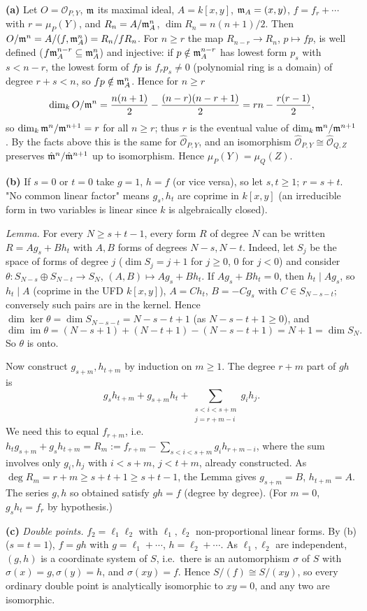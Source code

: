 \documentclass[11pt]{article}
\begin{document}
\textbf{(a)} Let $O=\mathcal O_{P,Y}$, $\mathfrak m$ its maximal ideal, $A=k[x,y]$, $\mathfrak m_A=(x,y)$, $f=f_r+\cdots$ with $r=\mu_P(Y)$, and $R_n=A/\mathfrak m_A^n$, $\dim R_n=n(n+1)/2$. Then $O/\mathfrak m^n=A/(f,\mathfrak m_A^n)=R_n/fR_n$. For $n\ge r$ the map $R_{n-r}\to R_n$, $p\mapsto fp$, is well defined ($f\mathfrak m_A^{n-r}\subseteq\mathfrak m_A^n$) and injective: if $p\notin\mathfrak m_A^{n-r}$ has lowest form $p_s$ with $s<n-r$, the lowest form of $fp$ is $f_rp_s\neq0$ (polynomial ring is a domain) of degree $r+s<n$, so $fp\notin\mathfrak m_A^n$. Hence for $n\ge r$
\[
\dim_kO/\mathfrak m^n=\frac{n(n+1)}2-\frac{(n-r)(n-r+1)}2=rn-\frac{r(r-1)}2,
\]
so $\dim_k\mathfrak m^n/\mathfrak m^{n+1}=r$ for all $n\ge r$; thus $r$ is the eventual value of $\dim_k\mathfrak m^n/\mathfrak m^{n+1}$. By the facts above this is the same for $\hat{\mathcal O}_{P,Y}$, and an isomorphism $\hat{\mathcal O}_{P,Y}\cong\hat{\mathcal O}_{Q,Z}$ preserves $\hat{\mathfrak m}^n/\hat{\mathfrak m}^{n+1}$ up to isomorphism. Hence $\mu_P(Y)=\mu_Q(Z)$.

\textbf{(b)} If $s=0$ or $t=0$ take $g=1$, $h=f$ (or vice versa), so let $s,t\ge1$; $r=s+t$. "No common linear factor" means $g_s,h_t$ are coprime in $k[x,y]$ (an irreducible form in two variables is linear since $k$ is algebraically closed).

\emph{Lemma.} For every $N\ge s+t-1$, every form $R$ of degree $N$ can be written $R=Ag_s+Bh_t$ with $A,B$ forms of degrees $N-s,N-t$. Indeed, let $S_j$ be the space of forms of degree $j$ ($\dim S_j=j+1$ for $j\ge0$, $0$ for $j<0$) and consider $\theta:S_{N-s}\oplus S_{N-t}\to S_N$, $(A,B)\mapsto Ag_s+Bh_t$. If $Ag_s+Bh_t=0$, then $h_t\mid Ag_s$, so $h_t\mid A$ (coprime in the UFD $k[x,y]$), $A=Ch_t$, $B=-Cg_s$ with $C\in S_{N-s-t}$; conversely such pairs are in the kernel. Hence $\dim\ker\theta=\dim S_{N-s-t}=N-s-t+1$ (as $N-s-t+1\ge0$), and
\[
\dim\operatorname{im}\theta=(N-s+1)+(N-t+1)-(N-s-t+1)=N+1=\dim S_N.
\]
So $\theta$ is onto.

Now construct $g_{s+m},h_{t+m}$ by induction on $m\ge1$. The degree $r+m$ part of $gh$ is
\[
g_sh_{t+m}+g_{s+m}h_t+\sum_{\substack{s<i<s+m\\ j=r+m-i}}g_ih_j .
\]
We need this to equal $f_{r+m}$, i.e.\ $h_tg_{s+m}+g_sh_{t+m}=R_m:=f_{r+m}-\sum_{s<i<s+m}g_ih_{r+m-i}$, where the sum involves only $g_i,h_j$ with $i<s+m$, $j<t+m$, already constructed. As $\deg R_m=r+m\ge s+t+1\ge s+t-1$, the Lemma gives $g_{s+m}=B$, $h_{t+m}=A$. The series $g,h$ so obtained satisfy $gh=f$ (degree by degree). (For $m=0$, $g_sh_t=f_r$ by hypothesis.)

\textbf{(c)} \emph{Double points.} $f_2=\ell_1\ell_2$ with $\ell_1,\ell_2$ non-proportional linear forms. By (b) ($s=t=1$), $f=gh$ with $g=\ell_1+\cdots$, $h=\ell_2+\cdots$. As $\ell_1,\ell_2$ are independent, $(g,h)$ is a coordinate system of $S$, i.e.\ there is an automorphism $\sigma$ of $S$ with $\sigma(x)=g,\sigma(y)=h$, and $\sigma(xy)=f$. Hence $S/(f)\cong S/(xy)$, so every ordinary double point is analytically isomorphic to $xy=0$, and any two are isomorphic.
\end{document}
